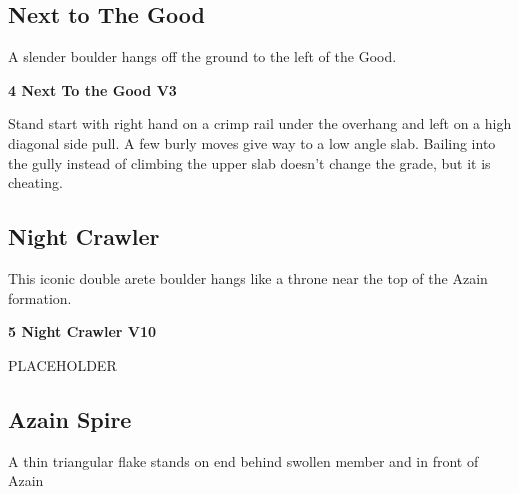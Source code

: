 \begin{multicols}{2}
			\subsection*{Next to The Good}\label{bf:Next to The Good}
			\begin{minipage}{\columnwidth}
			A slender boulder hangs off the ground to the left of the Good.
			\end{minipage}
			
					\begin{minipage}{\linewidth}	
					\label{rt:Next To the Good}
\colorbox{green!20}{
\textbf{
4 Next To the Good V3   \warn 
}
}

					\begin{adjustwidth}{0.5cm}{}				
					Stand start with right hand on a crimp rail under the overhang and left on a high diagonal side pull. A few burly moves give way to a low angle slab. Bailing into the gully instead of climbing the upper slab doesn't change the grade, but it is cheating.
					\end{adjustwidth}
					\end{minipage}
			\subsection*{Night Crawler}\label{bf:Night Crawler}
			\begin{minipage}{\columnwidth}
			This iconic double arete boulder hangs like a throne near the top of the Azain formation.
			\end{minipage}
			

					\begin{minipage}{\linewidth}	
					\label{rt:Night Crawler}
\colorbox{red!20}{
\textbf{
5 Night Crawler V10  
}
}

					\begin{adjustwidth}{0.5cm}{}				
					PLACEHOLDER
					\end{adjustwidth}
					\end{minipage}
			\subsection*{Azain Spire}\label{bf:Azain Spire}
			\begin{minipage}{\columnwidth}
			A thin triangular flake stands on end behind swollen member and in front of Azain
			\end{minipage}
			

\end{multicols}
